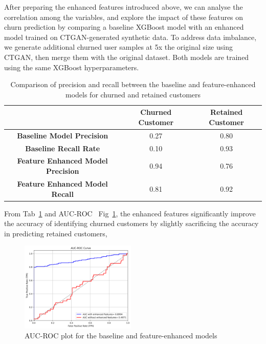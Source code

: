 \documentclass[journal=gmj]{CUP-JNL-DTM}%
\theoremstyle{definition}
\numberwithin{equation}{section}
\begin{document}
After preparing the enhanced features introduced above, we can analyse the correlation among the variables, and explore the impact of these features on churn prediction by comparing a baseline XGBoost model with an enhanced model trained on CTGAN-generated synthetic data. To address data imbalance, we generate additional churned user samples at 5x the original size using CTGAN, then merge them with the original dataset. Both models are trained using the same XGBoost hyperparameters.

\begin{table}[h]
    \centering
    \begin{tabular}{c|c|c}
        \hline
        & \textbf{Churned Customer} & \textbf{Retained Customer} \\
        \hline
        \textbf{Baseline Model Precision} & 0.27 & 0.80 \\
        \hline
        \textbf{Baseline Recall Rate} & 0.10 & 0.93 \\
        \hline
        \textbf{Feature Enhanced Model Precision} & 0.94 & 0.76 \\
        \hline
        \textbf{Feature Enhanced Model Recall} & 0.81 & 0.92 \\
        \hline
    \end{tabular}
    \caption{Comparison of precision and recall between the baseline and feature-enhanced models for churned and retained customers}
    \label{tab:metrics}
\end{table}

From Tab~\ref{tab:metrics} and AUC-ROC~\cite{BRADLEY19971145} Fig~\ref{fig:aucs}, the enhanced features significantly improve the accuracy of identifying churned customers by slightly sacrificing the accuracy in predicting retained customers,

\begin{figure}[h]
    \centering
    \includegraphics[width=0.49\textwidth]{Plots/AUCs.png}
    \caption{AUC-ROC plot for the baseline and feature-enhanced models}
    \label{fig:aucs}
\end{figure}
\end{document}
